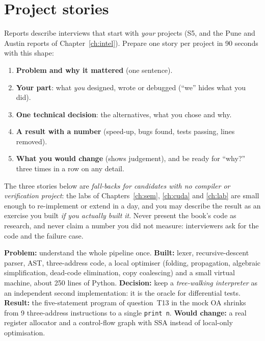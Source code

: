 \documentclass[10pt,a4paper,openany,oneside]{report}
\newcommand{\prio}[1]{\texorpdfstring{\ifcase#1\or{\color{gold}\ding{72}}\or{\color{gold}\ding{72}\ding{72}}\or{\color{gold}\ding{72}\ding{72}\ding{72}}\fi}{}}
\begin{document}
\section{Project stories \prio{3}}
Reports describe interviews that start with \emph{your} projects (S5, and the Pune and Austin reports of Chapter~\ref{ch:intel}). Prepare one story per project in 90 seconds with this shape:
\begin{enumerate}[nosep]
\item \textbf{Problem and why it mattered} (one sentence).
\item \textbf{Your part}: what \emph{you} designed, wrote or debugged (``we'' hides what you did).
\item \textbf{One technical decision}: the alternatives, what you chose and why.
\item \textbf{A result with a number} (speed-up, bugs found, tests passing, lines removed).
\item \textbf{What you would change} (shows judgement), and be ready for ``why?'' three times in a row on any detail.
\end{enumerate}
\begin{trapbox}
The three stories below are \emph{fall-backs for candidates with no compiler or verification project}: the labs of Chapters~\ref{ch:sem}, \ref{ch:cuda} and \ref{ch:lab} are small enough to re-implement or extend in a day, and you may describe the result as an exercise you built \emph{if you actually built it}. Never present the book's code as research, and never claim a number you did not measure: interviewers ask for the code and the failure case.
\end{trapbox}
\begin{exbox}
\textbf{Problem:} understand the whole pipeline once. \textbf{Built:} lexer, recursive-descent parser, AST, three-address code, a local optimiser (folding, propagation, algebraic simplification, dead-code elimination, copy coalescing) and a small virtual machine, about 250 lines of Python. \textbf{Decision:} keep a \emph{tree-walking interpreter} as an independent second implementation: it is the oracle for differential tests. \textbf{Result:} the five-statement program of question~T13 in the mock OA shrinks from 9 three-address instructions to a single \texttt{print n}. \textbf{Would change:} a real register allocator and a control-flow graph with SSA instead of local-only optimisation.
\end{exbox}
\end{document}

